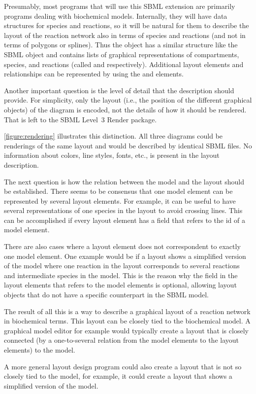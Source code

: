 Presumably, most programs that will use this SBML extension are 
primarily programs dealing with biochemical models. Internally, they 
will have data structures for species and reactions, so it will be 
natural for them to describe the layout of the reaction network also in 
terms of species and reactions (and not in terms of polygons or 
splines). Thus the  object has a similar structure like 
the SBML  object and contains lists of graphical 
representations of compartments, species, and reactions (called 
 and  
respectively). Additional layout elements and relationships can be 
represented by using the  and 
 elements. 

Another important question is the level of detail that the description 
should provide. For simplicity, only the layout (i.e., the position of 
the different graphical objects) of the diagram is encoded, not the 
details of how it should be rendered. That is left to the SBML Level~3 
Render package. 

\ref{figure:rendering} illustrates this distinction. All three diagrams 
could be renderings of the same layout and would be described by 
identical SBML files. No information about colors, line styles, fonts, 
etc., is present in the layout description. 

The next question is how the relation between the model and the layout 
should be established. There seems to be consensus that one model 
element can be represented by several layout elements. For example, it 
can be useful to have several representations of one species in the 
layout to avoid crossing lines. This can be accomplished if every layout 
element has a field that refers to the id of a model element. 

There are also cases where a layout element does not correspondent to 
exactly one model element. One example would be if a layout shows a 
simplified version of the model where one reaction in the layout 
corresponds to several reactions and intermediate species in the model. 
This is the reason why the field in the layout elements that refers to 
the model elements is optional, allowing layout objects that do not have 
a specific counterpart in the SBML model. 

The result of all this is a way to describe a graphical layout of a 
reaction network in biochemical terms. This layout can be closely tied 
to the biochemical model. A graphical model editor for example would 
typically create a layout that is closely connected (by a one-to-several 
relation from the model elements to the layout elements) to the model. 

A more general layout design program could also create a layout that is 
not so closely tied to the model, for example, it could create a layout 
that shows a simplified version of the model. 

